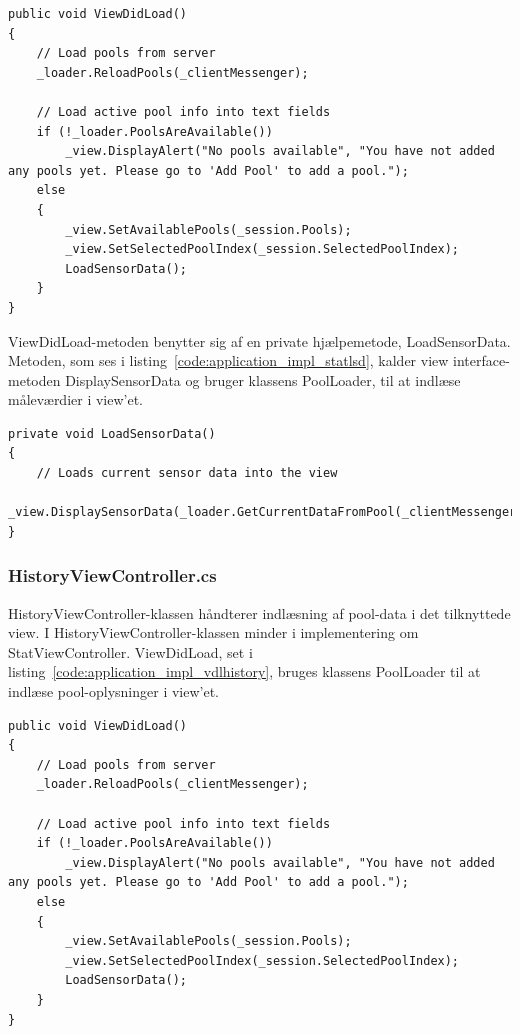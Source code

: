\begin{lstlisting}[caption={ViewDidLoad() in StatViewController},label={code:application_impl_vdlstat}]
public void ViewDidLoad()
{
	// Load pools from server
	_loader.ReloadPools(_clientMessenger);

	// Load active pool info into text fields
	if (!_loader.PoolsAreAvailable())
		_view.DisplayAlert("No pools available", "You have not added any pools yet. Please go to 'Add Pool' to add a pool.");
	else
	{
		_view.SetAvailablePools(_session.Pools);
		_view.SetSelectedPoolIndex(_session.SelectedPoolIndex);
		LoadSensorData();
	}
}
\end{lstlisting}

ViewDidLoad-metoden benytter sig af en private hjælpemetode, LoadSensorData. Metoden, som ses i listing~\ref{code:application_impl_statlsd}, kalder view interface-metoden DisplaySensorData og bruger klassens PoolLoader, til at indlæse måleværdier i view'et.

\begin{lstlisting}[caption={LoadSensorData() in StatViewController},label={code:application_impl_statlsd}]
private void LoadSensorData()
{
	// Loads current sensor data into the view
	_view.DisplaySensorData(_loader.GetCurrentDataFromPool(_clientMessenger));
}
\end{lstlisting}

\subsubsection{HistoryViewController.cs}
HistoryViewController-klassen håndterer indlæsning af pool-data i det tilknyttede view. I HistoryViewController-klassen minder i implementering om StatViewController. ViewDidLoad, set i listing~\ref{code:application_impl_vdlhistory}, bruges klassens PoolLoader til at indlæse pool-oplysninger i view'et.

\begin{lstlisting}[caption={ViewDidLoad() in HistoryViewController},label={code:application_impl_vdlhistory}]
public void ViewDidLoad()
{
	// Load pools from server
	_loader.ReloadPools(_clientMessenger);

	// Load active pool info into text fields
	if (!_loader.PoolsAreAvailable())
		_view.DisplayAlert("No pools available", "You have not added any pools yet. Please go to 'Add Pool' to add a pool.");
	else
	{
		_view.SetAvailablePools(_session.Pools);
		_view.SetSelectedPoolIndex(_session.SelectedPoolIndex);
		LoadSensorData();
	}
}
\end{lstlisting}

